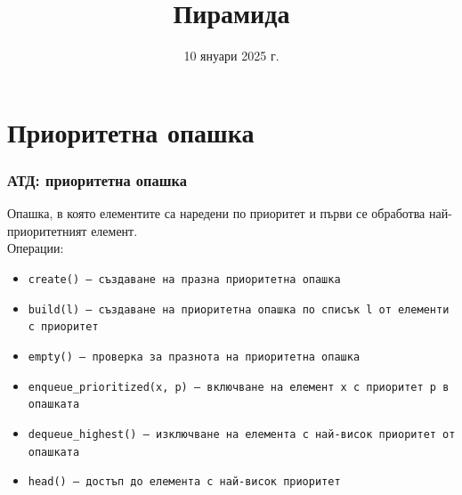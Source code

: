 \documentclass[alsotrans,beameroptions={aspectratio=169}]{beamerswitch}
\title{Пирамида}
\date{10 януари 2025 г.}
\begin{document}
\begin{frame}
  \titlepage
\end{frame}

\section{Приоритетна опашка}

\begin{frame}
  \frametitle{АТД: приоритетна опашка}

  Опашка, в която елементите са наредени по приоритет и първи се обработва най-приоритетният елемент.\\[1em]
  Операции:\\[0.5em]
  \begin{itemize}
  \item \tt{create()} --- създаване на празна приоритетна опашка
  \item \tt{build(l)} --- създаване на приоритетна опашка по списък \tt l от елементи с приоритет
  \item \tt{empty()} --- проверка за празнота на приоритетна опашка
  \item \tt{enqueue\_prioritized(x, p)} --- включване на елемент \tt x с приоритет \tt p в опашката
  \item \tt{dequeue\_highest()} --- изключване на елемента с най-висок приоритет от опашката
  \item \tt{head()} --- достъп до елемента с най-висок приоритет
  \end{itemize}
\end{frame}
\end{document}
